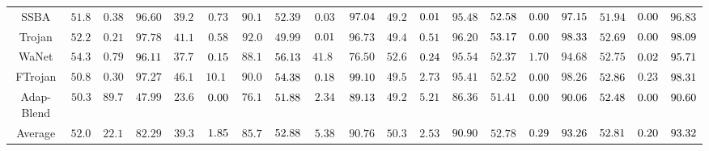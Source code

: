 \begin{table*}[t]
{\begin{tabular}{c|ccc|ccc|ccc|ccc|ccc|ccc}
SSBA \cite{li2021invisible} & $51.87$& $0.38$& $96.60$& $39.24$& $0.73$& $90.11$& $52.39$& $0.03$& $\cellcolor[HTML]{D7E8F2}97.04$& $49.25$& $\cellcolor[HTML]{D7E8F2}0.01$& $95.48$& $\cellcolor[HTML]{FEEBB8}52.58$& $\cellcolor[HTML]{FEEBB8}0.00$& $\cellcolor[HTML]{F1B9B6}97.15$& $51.94$& $\cellcolor[HTML]{F1B9B6}0.00$& $96.83$\\
Trojan \cite{Trojannn} & $52.28$& $0.21$& $97.78$& $41.1$& $0.58$& $92.0$& $49.99$& $\cellcolor[HTML]{D7E8F2}0.01$& $96.73$& $49.43$& $0.51$& $96.20$& $\cellcolor[HTML]{D7E8F2}53.17$& $\cellcolor[HTML]{FEEBB8}0.00$& $\cellcolor[HTML]{FEEBB8}98.33$& $52.69$& $\cellcolor[HTML]{F1B9B6}0.00$& $\cellcolor[HTML]{D7E8F2}98.09$\\
WaNet \cite{nguyen2021wanet} & $54.32$& $0.79$& $\cellcolor[HTML]{FEEBB8}96.11$& $37.71$& $\cellcolor[HTML]{FEEBB8}0.15$& $88.12$& $\cellcolor[HTML]{D7E8F2}56.13$& $41.82$& $76.50$& $52.64$& $\cellcolor[HTML]{D7E8F2}0.24$& $95.54$& $52.37$& $1.70$& $94.68$& $52.75$& $\cellcolor[HTML]{F1B9B6}0.02$& $\cellcolor[HTML]{D7E8F2}95.71$\\
FTrojan \cite{wang2022invisible} & $50.85$& $0.30$& $97.27$& $46.14$& $10.12$& $90.01$& $\cellcolor[HTML]{F1B9B6}54.38$& $\cellcolor[HTML]{D7E8F2}0.18$& $\cellcolor[HTML]{F1B9B6}99.10$& $49.55$& $2.73$& $95.41$& $52.52$& $\cellcolor[HTML]{F1B9B6}0.00$& $98.26$& $\cellcolor[HTML]{D7E8F2}52.86$& $0.23$& $\cellcolor[HTML]{D7E8F2}98.31$\\
Adap-Blend \cite{qi2023revisiting} & $50.3$& $89.73$& $47.99$& $23.6$& $\cellcolor[HTML]{D7E8F2}0.00$& $76.16$& $\cellcolor[HTML]{D7E8F2}51.88$& $2.34$& $\cellcolor[HTML]{D7E8F2}89.13$& $49.21$& $5.21$& $86.36$& $51.41$& $\cellcolor[HTML]{FEEBB8}0.00$& $\cellcolor[HTML]{FEEBB8}90.06$& $\cellcolor[HTML]{FEEBB8}52.48$& $\cellcolor[HTML]{F1B9B6}0.00$& $\cellcolor[HTML]{F1B9B6}90.60$\\ \midrule
Average & $52.04$& $22.16$& $82.29$& $39.3$& $\cellcolor[HTML]{D7E8F2}1.85$& $85.73$& $\cellcolor[HTML]{FEEBB8}52.88$& $5.38$& $90.76$& $50.31$& $2.53$& $\cellcolor[HTML]{D7E8F2}90.90$& $52.78$& $\cellcolor[HTML]{FEEBB8}0.29$& $\cellcolor[HTML]{FEEBB8}93.26$& $\cellcolor[HTML]{D7E8F2}52.81$& $\cellcolor[HTML]{F1B9B6}0.20$& $\cellcolor[HTML]{F1B9B6}93.32$\\

\bottomrule
\end{tabular}}
\end{table*}
